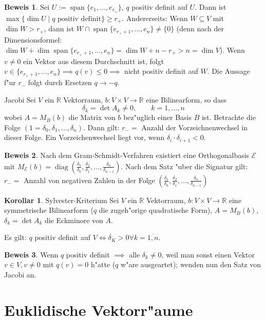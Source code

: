 \documentclass[oneside,fontsize=11pt,paper=a4,BCOR=0mm,DIV=12,automark,headsepline]{scrbook}
\DeclareMathOperator{\mDiag}{diag}
\DeclareMathOperator{\spn}{span}
\theoremstyle{remark}
\theoremstyle{definition}
\newtheorem*{korollar}{Korollar}
\theoremstyle{definition}
\newtheorem*{prof}{Beweis}
\theoremstyle{remark}
\begin{document}
\begin{prof}
  Sei \(U:=\spn\{e_1,\dots,e_{r_+}\}\), \(q\) positiv definit auf \(U\). Dann ist \(\max\{\dim U\mid q\text{ positiv definit}\}\geq r_+\). Andererseits: Wenn \(W\subseteq V\) mit \(\dim W > r_+\), dann ist \(W\cap \spn\{e_{r_++1},\dots,e_n\}\neq \{0\}\) (denn nach der Dimensionsformel: \(\dim W + \dim \spn\{e_{r_++1},\dots,e_n\} = \dim W + n - r_+ > n = \dim V\)). Wenn \(v\neq 0\) ein Vektor aus diesem Durchschnitt ist, folgt \(v\in \{e_{r_++1},\dots,e_n\} \implies q(v)\leq 0\implies\) nicht positiv definit auf \(W\). Die Aussage f"ur \(r_-\) folgt durch Ersetzen \(q \rightarrow -q\).
\end{prof}
\begin{satz}{Jacobi}{}
  Sei $V$ ein $\mathbb{R}$ Vektorraum, $b: V\times V \rightarrow \mathbb{R}$
  eine Bilinearform, so dass \[\delta_k = \det A_k \neq 0, \qquad k=1,\dots,n\]
  wobei \(A = M_B(b)\) die Matrix von \(b\) bez"uglich einer Basis \(B\) ist. Betrachte die Folge \((1 = \delta_0, \delta_1,\dots,\delta_n)\). Dann gilt: \(r_- = \) Anzahl der Vorzeichnenwechsel in dieser Folge. Ein Vorzeichenwechsel liegt vor, wenn \(\delta_i\cdot\delta_{i+1} < 0\).
\end{satz}
\begin{prof}
  Nach dem Gram-Schmidt-Verfahren existiert eine Orthogonalbasis \(\mathcal{E}\) mit \(M_{\mathcal{E}}(b) = \mDiag (\frac{\delta_1}{\delta_0}, \frac{\delta_2}{\delta_1},\dots,\frac{\delta_n}{\delta_{n-1}})\). Nach dem Satz "uber die Signatur gilt: \(r_- = \) Anzahl von negativen Zahlen in der Folge \((\frac{\delta_1}{\delta_0},\frac{\delta_2}{\delta_1},\dots,\frac{\delta_n}{\delta_{n-1}})\)
\end{prof}
\begin{korollar}{Sylvester-Kriterium}
  Sei $V$ ein $\mathbb{R}$ Vektorraum, $b: V\times V \rightarrow \mathbb{R}$
  eine symmetrische Bilinearform (\(q\) die zugeh"orige quadratische Form), $A=M_B(b)$, $\delta_k = \det A_k$ die Eckminore von $A$.

  Es gilt: $q$ positiv definit auf $V \iff \delta_K > 0 \forall k=\overline{1,n}$.
\end{korollar}
\begin{prof}
  Wenn $q$ positiv definit $\implies$ alle $\delta_k\neq 0$, weil man sonst einen Vektor
  $v\in V, v\neq 0$ mit $q(v)=0$ h"atte ($q$ w"are ausgeartet); wenden nun den Satz von
  Jacobi an.
\end{prof}

\chapter{Euklidische Vektorr"aume}
\label{sec:evr}
\end{document}
